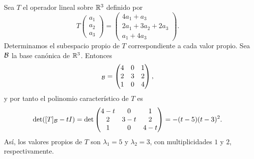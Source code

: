\documentclass[12pt,a4paper]{book}
\begin{document}
    \begin{ejemplo}
        Sea $T$ el operador lineal sobre $\mathbb{R}^3$ definido por
        \begin{equation*}
            T\begin{pmatrix}a_1\\a_2\\a_3\end{pmatrix}=\begin{pmatrix}4a_1+a_3\\2a_1+3a_2+2a_3\\a_1+4a_3\end{pmatrix}.
        \end{equation*}
        Determinamos el subespacio propio de $T$ correspondiente a cada valor propio. Sea $\mathcal{B}$ la base canónica de $\mathbb{R}^3$. Entonces
        \begin{equation*}
            [T]_{\BB}=\begin{pmatrix}4&0&1\\2&3&2\\1&0&4\end{pmatrix},
        \end{equation*}
        y por tanto el polinomio característico de $T$ es
        \begin{equation*}
            \det([T]_{\mathcal{B}}-tI)=\det\begin{pmatrix}4-t&0&1\\2&3-t&2\\1&0&4-t\end{pmatrix}=-(t-5)(t-3)^2.
        \end{equation*}
        Así, los valores propios de $T$ son $\lambda_1=5$ y $\lambda_2=3$, con multiplicidades $1$ y $2$, respectivamente.


\end{ejemplo}
\end{document}
